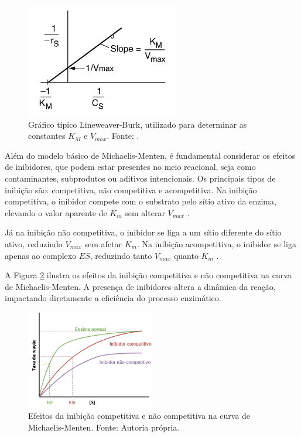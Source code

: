 \documentclass[12pt,oneside]{report}
\begin{document}
\begin{figure}[H]
    \centering
    \includegraphics[width=0.6\textwidth]{img/LB.png}
    \caption{\small Gráfico típico Lineweaver-Burk, utilizado para determinar as constantes $K_M$ e $V_{max}$. Fonte: \cite{FOGLER_2016}.}
    \label{fig:lineweaver_burk}
\end{figure}

Além do modelo básico de Michaelis-Menten, é fundamental considerar os efeitos de inibidores, que podem estar presentes no meio reacional, seja como contaminantes, subprodutos ou aditivos intencionais. Os principais tipos de inibição são: competitiva, não competitiva e acompetitiva. Na inibição competitiva, o inibidor compete com o substrato pelo sítio ativo da enzima, elevando o valor aparente de
$K_m$ sem alterar $V_{max}$ \cite{FOGLER_2016}.

Já na inibição não competitiva, o inibidor se liga a um sítio diferente do sítio ativo, reduzindo $V_{max}$ sem afetar $K_m$. Na inibição acompetitiva, o inibidor se liga apenas ao complexo $ES$, reduzindo tanto $V_{max}$ quanto $K_m$ \cite{FOGLER_2016}.

A Figura \ref{fig:inibicao} ilustra os efeitos da inibição competitiva e não competitiva na curva de Michaelis-Menten. A presença de inibidores altera a dinâmica da reação, impactando diretamente a eficiência do processo enzimático.

\begin{figure}[H]
    \centering
    \includegraphics[width=0.5\textwidth]{img/inibicao.png}
    \caption{\small Efeitos da inibição competitiva e não competitiva na curva de Michaelis-Menten. Fonte: Autoria própria.}
    \label{fig:inibicao}
\end{figure}
\end{document}
